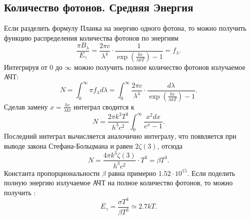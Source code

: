 \subsection{Количество фотонов. Средняя Энергия}
Если разделить формулу Планка на энергию одного фотона, то можно получить функцию распределения количества фотонов по энергиям
\begin{equation*}
	\frac{\pi B_{\lambda}}{E_{\gamma}} = \frac{2 \pi c}{\lambda^4} \cdot \frac{1}{\exp\left(\frac{hc}{\lambda k T}\right)-1} = f_{\lambda}.
\end{equation*}
Интегрируя от 0 до $\infty$ можно получить полное количество фотонов излучаемое АЧТ:
\begin{equation*}
	N = \int_{0}^{\infty}{\pi f_{\lambda}d\lambda} = \int_{0}^{\infty}{\frac{2\pi c}{\lambda^4} \cdot \frac{d\lambda}{\exp\left(\frac{hc}{\lambda k T}\right)-1}}.
\end{equation*}
Сделав замену $x = \frac{hc}{\lambda kt}$ интеграл сводится к
\begin{equation*}
	N = \frac{2\pi k^3 T^3}{h^3 c^2}\int_{0}^{\infty}{\frac{x^2 dx}{e^x-1}}.
\end{equation*}
Последний интеграл вычисляется аналочично интегралу, что появляется при выводе закона Стефана-Больцмана и равен $2\zeta(3)$, отсюда
\begin{equation}
	N = \frac{4\pi k^3 \zeta(3)}{h^3 c^2} \cdot T^3 = \beta T^3.
\end{equation}
Константа пропорциональности $\beta$ равна примерно $1.52 \cdot 10^{15}$. Если поделить полную энергию излучаемое АЧТ на полное количество фотонов, то можно получить :
\begin{equation}
	\overline{E_{\gamma}} = \frac{\sigma T^4}{\beta T^3} \simeq 2.7 k T.
\end{equation}